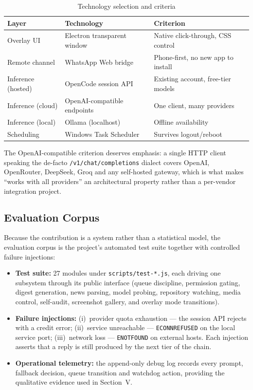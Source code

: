 \documentclass[conference]{IEEEtran}
\begin{document}
\begin{table}[t]
\centering\small
\caption{Technology selection and criteria}\label{tab:stack}
\begin{tabular}{@{}p{}p{}p{}@{}}
\toprule
\textbf{Layer} & \textbf{Technology} & \textbf{Criterion} \\
\midrule
Overlay UI & Electron transparent window &
Native click-through, CSS control \\
Remote channel & WhatsApp Web bridge &
Phone-first, no new app to install \\
Inference (hosted) & OpenCode session API &
Existing account, free-tier models \\
Inference (cloud) & OpenAI-compatible endpoints &
One client, many providers \\
Inference (local) & Ollama (localhost) &
Offline availability \\
Scheduling & Windows Task Scheduler &
Survives logout/reboot \\
\bottomrule
\end{tabular}
\end{table}

The OpenAI-compatible criterion deserves emphasis: a single
HTTP client speaking the de-facto \texttt{/v1/chat/completions}
dialect covers OpenAI, OpenRouter, DeepSeek, Groq and any
self-hosted gateway, which is what makes ``works with all
providers'' an architectural property rather than a per-vendor
integration project.

\subsection{Evaluation Corpus}

Because the contribution is a system rather than a statistical
model, the evaluation corpus is the project's automated test
suite together with controlled failure injections:

\begin{itemize}
  \item \textbf{Test suite:} 27 modules under
  \texttt{scripts/test-*.js}, each driving one subsystem through
  its public interface (queue discipline, permission gating,
  digest generation, news parsing, model probing, repository
  watching, media control, self-audit, screenshot gallery, and
  overlay mode transitions).
  \item \textbf{Failure injections:} (i)~provider quota
  exhaustion --- the session API rejects with a credit error;
  (ii)~service unreachable --- \texttt{ECONNREFUSED} on the local
  service port; (iii)~network loss --- \texttt{ENOTFOUND} on
  external hosts. Each injection asserts that a reply is still
  produced by the next tier of the chain.
  \item \textbf{Operational telemetry:} the append-only debug log
  records every prompt, fallback decision, queue transition and
  watchdog action, providing the qualitative evidence used in
  Section~V.
\end{itemize}
\end{document}
